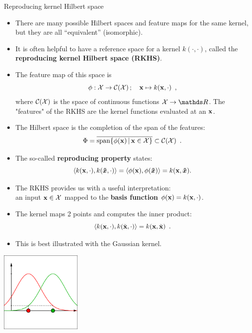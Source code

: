 \documentclass[11pt,compress,t,notes=noshow, xcolor=table]{beamer}
\begin{document}
\begin{vbframe}{Reproducing kernel Hilbert space}

  \begin{itemize}
    \item There are many possible Hilbert spaces and feature maps for
    the same kernel, but they are all ``equivalent'' (isomorphic).
    \item It is often helpful to have a reference space for a kernel $k(\cdot,\cdot)$, called the \textbf{reproducing kernel Hilbert space (RKHS)}. 
    \item The feature map of this space is
    $$
      \phi : \mathcal{X} \to \mathcal{C}(\mathcal{X}) \,;\quad \mathbf{x} \mapsto k(\mathbf{x}, \cdot)
      \enspace,
    $$
    where $\mathcal{C}(\mathcal{X})$ is the space of continuous functions
    $\Xspace \to \R$. The "features" of the RKHS are the kernel functions evaluated at an $\mathbf{x}$. 
    \item The Hilbert space is the completion of the span of the features:
    $$
      \Phi = \overline{\operatorname{span}\{\phi(\mathbf{x}) \,|\, \mathbf{x} \in \mathcal{X} \}} \subset \mathcal{C}(\mathcal{X})
      \enspace.
    $$
\item The so-called \textbf{reproducing property} states: 
$$
  \left\langle k(\mathbf{x}, \cdot), k(\bm{\tilde{x}}, \cdot) \right\rangle = \left\langle \phi(\mathbf{x}), \phi(\bm{\tilde{x}}) \right\rangle = k(\mathbf{x}, \bm{\tilde{x}}).
$$
  \end{itemize}

\framebreak

  \begin{itemize}
    \item The RKHS provides us with a useful interpretation:\\
    an input $\mathbf{x} \in \mathcal{X}$ mapped to the \textbf{basis function}
    $\phi(\mathbf{x}) = k(\mathbf{x}, \cdot)$.
    \item The kernel maps 2 points and computes the inner product:
    $$
      \langle k(\mathbf{x}, \cdot), k( \tilde {\mathbf{x}}, \cdot) \rangle = k(\mathbf{x}, \tilde {\mathbf{x}})
      \enspace.
    $$
    \item This is best illustrated with the Gaussian kernel.


  \end{itemize}

\begin{center}
    \includegraphics[width=4cm]{figure_man/kernels/features-2.pdf}
\end{center}


\end{vbframe}
\end{document}
